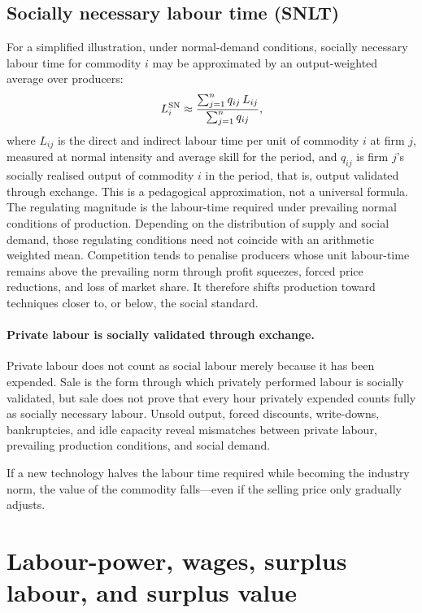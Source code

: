 \subsection{Socially necessary labour time (SNLT)}
\label{sec:snlt}

For a simplified illustration, under normal-demand conditions, socially necessary labour time for commodity \(i\) may be approximated by an output-weighted average over producers:
\begin{equation}
L^{\mathrm{SN}}_{i} \approx
\frac{\sum_{j=1}^{n} q_{ij}\,L_{ij}}
{\sum_{j=1}^{n} q_{ij}},
\label{eq:snlt}
\end{equation}
where \(L_{ij}\) is the direct and indirect labour time per unit of commodity \(i\) at firm \(j\), measured at normal intensity and average skill for the period, and \(q_{ij}\) is firm \(j\)'s socially realised output of commodity \(i\) in the period, that is, output validated through exchange. This is a pedagogical approximation, not a universal formula. The regulating magnitude is the labour-time required under prevailing normal conditions of production. Depending on the distribution of supply and social demand, those regulating conditions need not coincide with an arithmetic weighted mean. Competition tends to penalise producers whose unit labour-time remains above the prevailing norm through profit squeezes, forced price reductions, and loss of market share. It therefore shifts production toward techniques closer to, or below, the social standard.

\paragraph{Private labour is socially validated through exchange.} Private labour does not count as social labour merely because it has been expended. Sale is the form through which privately performed labour is socially validated, but sale does not prove that every hour privately expended counts fully as socially necessary labour. Unsold output, forced discounts, write-downs, bankruptcies, and idle capacity reveal mismatches between private labour, prevailing production conditions, and social demand.\cite{Marx1867}

If a new technology halves the labour time required while becoming the
industry norm, the value of the commodity falls—even if the selling price
only gradually adjusts.


\section{Labour-power, wages, surplus labour, and surplus value}
\label{sec:labour-surplus}

